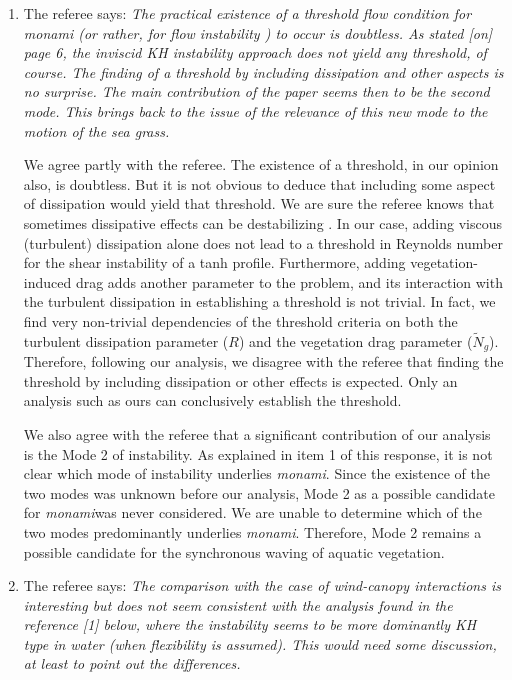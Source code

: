 \documentclass[letterpaper,10pt]{article}
\newcommand{\Rey}{{R}}
\newcommand{\Ndg}{\tilde{N}_g}
\newcommand{\monami}{\textit{monami}}
\begin{document}
\begin{enumerate}
\item The referee says:
\textit{
The practical existence of a threshold flow condition for monami (or rather,  for flow instability ) to occur is doubtless.  As stated [on] page 6, the inviscid KH instability approach does not yield any threshold, of course. The finding of a threshold by including dissipation and other aspects is no surprise. The main contribution of the paper seems then to be the second mode. This brings back to the issue of the relevance of this new mode to the motion of the sea grass.
}

We agree partly with the referee. The existence of a threshold, in our opinion also, is doubtless. 
But it is not obvious to deduce that including some aspect of dissipation would yield that threshold. 
We are sure the referee knows that sometimes dissipative effects can be destabilizing \citep{Krechetnikov2007}. 
In our case, adding viscous (turbulent) dissipation alone does not lead to a threshold in Reynolds number for the shear instability of a tanh profile. 
Furthermore, adding vegetation-induced drag adds another parameter to the problem, and its interaction with the turbulent dissipation in establishing a threshold is not trivial. 
In fact, we find very non-trivial dependencies of the threshold criteria on both the turbulent dissipation parameter ($\Rey$) and the vegetation drag parameter ($\Ndg$). 
Therefore, following our analysis, we disagree with the referee that finding the threshold  by including dissipation or other effects is expected. 
Only an analysis such as ours can conclusively establish the threshold.

We also agree with the referee that a significant contribution of our analysis is the Mode 2 of instability.
As explained in item 1 of this response, it is not clear which mode of instability underlies \monami.
Since the existence of the two modes was unknown before our analysis, Mode 2 as a possible candidate for \monami was never considered. 
We are unable to determine which of the two modes predominantly underlies \monami.
Therefore, Mode 2 remains a possible candidate for the synchronous waving of aquatic vegetation.

\item The referee says:
\textit{
The comparison with the case of wind-canopy interactions is interesting but does not seem consistent with the analysis found in the reference [1]  below, where the instability seems to be more dominantly KH type in water  (when flexibility is assumed).  This would need some discussion, at least to point out the differences.
}


\end{enumerate}
\end{document}
